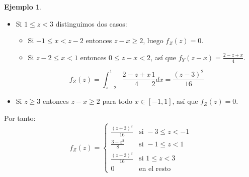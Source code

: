 \documentclass{report}
\theoremstyle{remark}
\theoremstyle{remark}
\theoremstyle{remark}
\theoremstyle{definition}
\theoremstyle{definition}
\theoremstyle{definition}
\newtheorem*{example}{Ejemplo}
\theoremstyle{definition}
\begin{document}
\begin{example}
\begin{itemize}
        \item Si $1 \leq z < 3$ distinguimos dos casos:
              \begin{itemize}
                  \item Si $-1 \leq x < z-2$ entonces $z-x \geq 2$, luego $f_Z(z) = 0$.
                  \item Si $z-2 \leq x < 1$ entonces $0 \leq z-x < 2$, así que $f_Y(z-x) = \frac{2-z+x}{4}$.
              \end{itemize}
              $$f_Z(z) = \int_{z-2}^1 \frac{2-z+x}{4} \frac{1}{2} dx = \frac{(z-3)^2}{16}$$
        \item Si $z \geq 3$ entonces $z-x \geq 2$ para todo $x \in [-1, 1]$, así que $f_Z(z) = 0$.
    \end{itemize}
    Por tanto:
    $$f_Z(z) = \begin{cases}
            \frac{(z+3)^2}{16} & \text{si } -3 \leq z < -1 \\
            \frac{3-z^2}{8}    & \text{si } -1 \leq z < 1  \\
            \frac{(z-3)^2}{16} & \text{si } 1 \leq z < 3   \\
            0                  & \text{en el resto}
        \end{cases}$$
\end{example}
\end{document}
